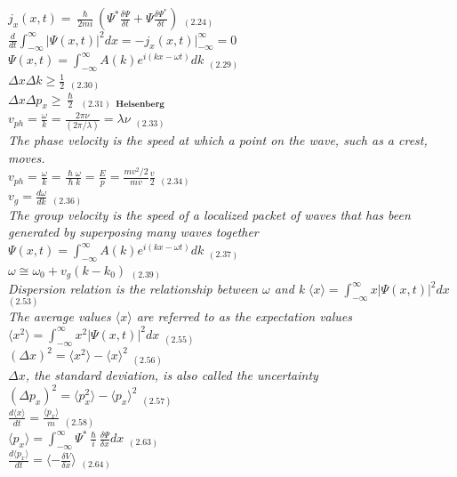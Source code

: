 \documentclass[0pt]{report}
\begin{document}
\begin{multicols}{3}
\begin{flushleft}
$j_x(x,t)=\frac{\hslash}{2mi}(\Psi^*\frac{\delta \Psi}{\delta t}+\Psi\frac{\delta \Psi^*}{\delta t})$ $_{(2.24)}$\\
$\frac{d}{dt}\int_{-\infty}^{\infty}|\Psi(x,t)|^2dx=-j_x(x,t)|_{-\infty}^{\infty}=0$\\
$\Psi(x,t)=\int_{-\infty}^{\infty}A(k)e^{i(kx-\omega t)}dk$ $_{(2.29)}$\\
$\Delta x\Delta k\geq\frac{1}{2}$ $_{(2.30)}$\\
$\Delta x\Delta p_x\geq\frac{\hslash}{2}$ $_{(2.31)}$ $_{\textbf{Heisenberg}}$\\
$v_{ph}=\frac{\omega}{k}=\frac{2\pi\nu}{(2\pi/\lambda)}=\lambda\nu$ $_{(2.33)}$\\
\textit{The phase velocity is the speed at which a point on the wave, such as a crest, moves.}\\
$v_{ph}=\frac{\omega}{k}=\frac{\hslash\omega}{\hslash k}=\frac{E}{p}=\frac{mv^2/2}{mv}\frac{v}{2}$ $_{(2.34)}$\\
$v_g=\frac{d\omega}{dk}$ $_{(2.36)}$\\
\textit{The group velocity is the speed of a localized packet of waves that has been generated by superposing many waves together}\\
$\Psi(x,t)=\int_{-\infty}^{\infty}A(k)e^{i(kx-\omega t)}dk$ $_{(2.37)}$\\
$\omega\cong\omega_0+v_g(k-k_0)$ $_{(2.39)}$\\
\textit{Dispersion relation is the relationship between $\omega$ and k}
$\langle x\rangle =\int_{-\infty}^{\infty}x|\Psi(x,t)|^2dx$ $_{(2.53)}$\\
\textit{The average values $\langle x\rangle $ are referred to as the expectation values}\\
$\langle x^2\rangle =\int_{-\infty}^{\infty}x^2|\Psi(x,t)|^2dx$ $_{(2.55)}$\\
$(\Delta x)^2=\langle x^2\rangle -\langle x\rangle ^2$ $_{(2.56)}$\\
\textit{$\Delta x$, the standard deviation, is also called the uncertainty}\\
$(\Delta p_x)^2=\langle p_x^2\rangle -\langle p_x\rangle ^2$ $_{(2.57)}$\\
$\frac{d\langle x\rangle }{dt}=\frac{\langle p_x\rangle }{m}$ $_{(2.58)}$\\
$\langle p_x\rangle =\int_{-\infty}^{\infty}\Psi^*\frac{\hslash}{i}\frac{\delta\Psi}{\delta x}dx$ $_{(2.63)}$\\
$\frac{d\langle p_x\rangle }{dt}=\langle-\frac{\delta V}{\delta x}\rangle$ $_{(2.64)}$\\


\end{flushleft}
\end{multicols}
\end{document}
